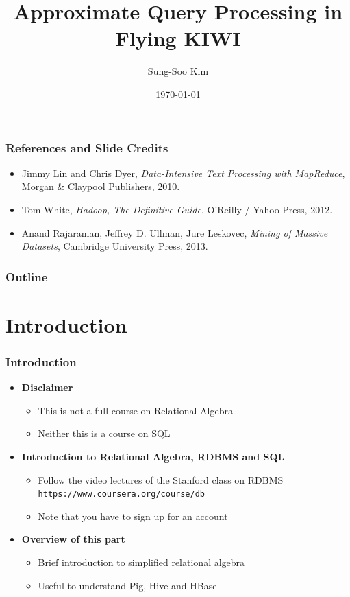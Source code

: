 \documentclass{beamer}
\title[Flying KIWI]{Approximate Query Processing in Flying KIWI} %
\author{Sung-Soo Kim} %
\institute[ETRI] %
{
\textit{sungsoo@etri.re.kr} \\ %
\medskip
Data Management Research Section, ETRI %
}
\date{\today} %
\newcommand{\bi}{\begin{itemize}}
\newcommand{\ei}{\end{itemize}}
\newcommand{\ii}{\item}
\begin{document}
\begin{frame}
\titlepage %
\end{frame}

\begin{frame}
\frametitle{References and Slide Credits}
\bi
\ii Jimmy Lin and Chris Dyer, \textit{Data-Intensive Text Processing with MapReduce}, Morgan \& Claypool Publishers, 2010.
\ii Tom White, \textit{Hadoop, The Definitive Guide}, O'Reilly / Yahoo Press, 2012.
\ii Anand Rajaraman, Jeffrey D. Ullman, Jure Leskovec, \textit{Mining of Massive Datasets}, Cambridge University Press, 2013. 
\ei
\end{frame}

\begin{frame}
\frametitle{Outline} %
\tableofcontents 
\end{frame}



\section{Introduction} 

\begin{frame}
\frametitle{Introduction}
\bi
\ii \textbf{Disclaimer}
\bi
\ii This is not a full course on Relational Algebra
\ii Neither this is a course on SQL
\ei
\ei

\bi
\ii \textbf{Introduction to Relational Algebra, RDBMS and SQL}
\bi
\ii Follow the video lectures of the Stanford class on RDBMS \href{https://www.coursera.org/course/db}{\texttt{https://www.coursera.org/course/db}}
\ii Note that you have to sign up for an account 
\ei
\ei

\bi
\ii \textbf{Overview of this part}
\bi
\ii Brief introduction to simplified relational algebra
\ii Useful to understand Pig, Hive and HBase
\ei
\ei
\end{frame}
\end{document}
